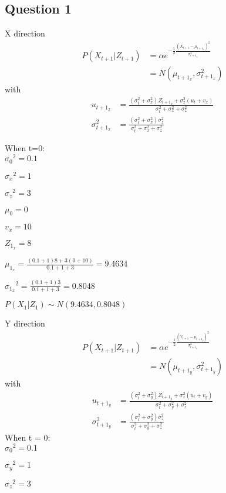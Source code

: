 \documentclass[12pt]{amsart}
\begin{document}
\subsection*{Question 1}
X direction
\begin {align*}
P(X_{t+1} | Z_{t+1}) &= \alpha e^{- \frac{1}{2} \frac{(X_{t+1} - \mu_{t+1_x})^2}{\sigma_{t+1_x}^2}} \\
                     & = N(\mu_{t+1_x}, \sigma_{t+1_x}^2)
\end {align*}
with
\begin {align*}
	u_{t+1_x} &= \frac{(\sigma_t^2 + \sigma_x^2)Z_{t+1_x} + \sigma_z^2(u_t + v_x)}{\sigma_t^2 + \sigma_x^2 + \sigma_z^2} \\
	\sigma_{t+1_x}^2 &= \frac{(\sigma_t^2 + \sigma_x^2) \sigma_z^2}{\sigma_t^2 + \sigma_x^2 + \sigma_z^2}
\end {align*}

When t=0:\\

${\sigma_{0}}^{2} = 0.1$

${\sigma_{x}}^{2} = 1$

${\sigma_{z}}^{2} = 3$

${\mu_{0}}= 0$

${v_{x}}= 10$

${Z_{1_x}}= 8$

${\mu_{1_x}}=  \frac{(0.1+1)8+3(0+10)}{0.1+1+3} = 9.4634$

${\sigma_{1_x}}^{2}=  \frac{(0.1+1)3}{0.1+1+3} = 0.8048$

$ P(X_1 | Z_1) \sim N(9.4634,0.8048)$

Y direction
\begin {align*}
P(X_{t+1} | Z_{t+1}) &= \alpha e^{- \frac{1}{2} \frac{(Y_{t+1} - \mu_{t+1_y})^2}{\sigma_{t+1_y}^2}} \\
                     & = N(\mu_{t+1_y}, \sigma_{t+1_y}^2)
\end {align*}
with
\begin {align*}
	u_{t+1_y} &= \frac{(\sigma_t^2 + \sigma_y^2)Z_{t+1_y} + \sigma_z^2(u_t + v_y)}{\sigma_t^2 + \sigma_y^2 + \sigma_z^2} \\
	\sigma_{t+1_y}^2 &= \frac{(\sigma_t^2 + \sigma_y^2) \sigma_z^2}{\sigma_t^2 + \sigma_y^2 + \sigma_z^2}
\end {align*}
When t = 0: \\
${\sigma_{0}}^{2} = 0.1$

${\sigma_{y}}^{2} = 1$

${\sigma_{z}}^{2} = 3$
\end{document}
